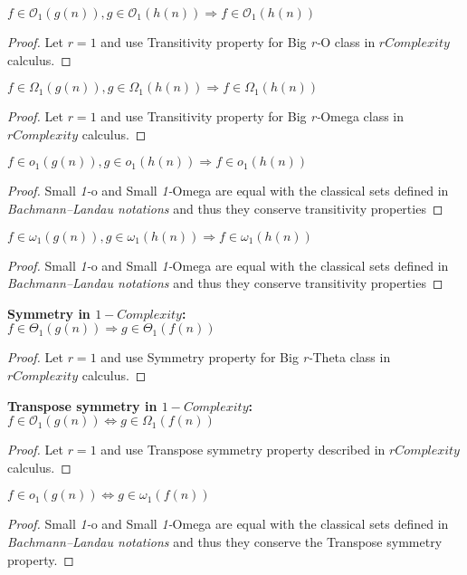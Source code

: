 \begin{theorem} 
 $ f \in \mathcal{O}_{1}(g(n)),  g \in \mathcal{O}_{1}(h(n)) \Rightarrow  f \in \mathcal{O}_{1}(h(n))$ 
\end{theorem} 
\begin{proof} 
   Let $r = 1$ and use Transitivity property for Big \textit{r-}O class in $rComplexity$ calculus.
\end{proof} 
\begin{theorem} 
 $ f \in \Omega_{1}(g(n)),  g \in \Omega_{1}(h(n)) \Rightarrow  f \in \Omega_{1}(h(n))$ 
\end{theorem} 
\begin{proof} 
   Let $r = 1$ and use Transitivity property for Big \textit{r-}Omega class in $rComplexity$ calculus.
\end{proof} 
\begin{theorem} 
 $ f \in o_{1}(g(n)),  g \in o_{1}(h(n)) \Rightarrow  f \in o_{1}(h(n))$ 
\end{theorem} 
\begin{proof} 
   Small \textit{1-}o and Small \textit{1-}Omega are equal with the classical sets defined in \textit{Bachmann–Landau notations} and thus they conserve transitivity properties
\end{proof} 
\begin{theorem} 
 $ f \in \omega_{1}(g(n)),  g \in \omega_{1}(h(n)) \Rightarrow  f \in \omega_{1}(h(n))$
\end{theorem} 
\begin{proof} 
   Small \textit{1-}o and Small \textit{1-}Omega are equal with the classical sets defined in \textit{Bachmann–Landau notations} and thus they conserve transitivity properties
\end{proof} 


\begin{theorem} 
 \textbf{Symmetry in $1-Complexity$:}  \\  $ f \in \Theta_{1}(g(n)) \Rightarrow g \in \Theta_{1}(f(n)) $
\end{theorem} 
\begin{proof} 
   Let $r = 1$ and use Symmetry property for Big \textit{r-}Theta class in $rComplexity$ calculus.
\end{proof} 

\begin{theorem} 
 \textbf{Transpose symmetry in $1-Complexity$:}  \\  $ f \in \mathcal{O}_{1}(g(n)) \Leftrightarrow g \in \Omega_{1}(f(n)) $
\end{theorem} 
\begin{proof} 
   Let $r = 1$ and use Transpose symmetry property described in $rComplexity$ calculus.
\end{proof} 
\begin{theorem} 
 $ f \in o_{1}(g(n)) \Leftrightarrow g \in \omega_{1}(f(n)) $
\end{theorem} 
\begin{proof} 
   Small \textit{1-}o and Small \textit{1-}Omega are equal with the classical sets defined in \textit{Bachmann–Landau notations} and thus they conserve the Transpose symmetry property.
\end{proof} 
 
